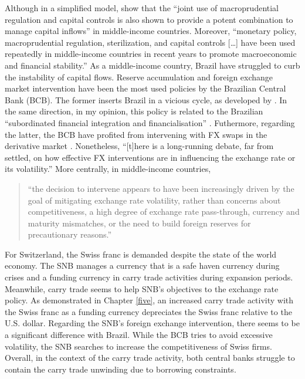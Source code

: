 \documentclass[a4paper, twoside]{templates/ociamthesis}
\begin{document}
Although in a simplified model, \textcite[ 1]{agenor2021} show that the ``joint use of macroprudential regulation and capital controls is also shown to provide a potent combination to manage capital inflows'' in middle-income countries. Moreover, ``monetary policy, macroprudential regulation, sterilization, and capital controls {[}\ldots{]} have been used repeatedly in middle-income countries in recent years to promote macroeconomic and financial stability.'' \autocite[ 58]{agenor2021} As a middle-income country, Brazil have struggled to curb the instability of capital flows. Reserve accumulation and foreign exchange market intervention have been the most used policies by the Brazilian Central Bank (BCB). The former inserts Brazil in a vicious cycle, as developed by \textcite{darista2018}. In the same direction, in my opinion, this policy is related to the Brazilian ``subordinated financial integration and financialisation'' \autocite{kaltenbrunner2018a}. Futhermore, regarding the latter, the BCB have profited from intervening with FX swaps in the derivative market \autocite{sandri2020}. Nonetheless, ``{[}t{]}here is a long-running debate, far from settled, on how effective FX interventions are in influencing the exchange rate or its volatility.'' \autocite[ 32]{patel2019} More centrally, in middle-income countries,

\begin{quote}
``the decision to intervene appears to have been increasingly driven by the goal of mitigating exchange rate volatility, rather than concerns about competitiveness, a high degree of exchange rate pass-through, currency and maturity mismatches, or the need to build foreign reserves for precautionary reasons.'' \autocite[ 2]{agenor2021}
\end{quote}

For Switzerland, the Swiss franc is demanded despite the state of the world economy. The SNB manages a currency that is a safe haven currency during crises and a funding currency in carry trade activities during expansion periods. Meanwhile, carry trade seems to help SNB's objectives to the exchange rate policy. As demonstrated in Chapter \ref{five}, an increased carry trade activity with the Swiss franc as a funding currency depreciates the Swiss franc relative to the U.S. dollar. Regarding the SNB's foreign exchange intervention, there seems to be a significant difference with Brazil. While the BCB tries to avoid excessive volatility, the SNB searches to increase the competitiveness of Swiss firms. Overall, in the context of the carry trade activity, both central banks struggle to contain the carry trade unwinding due to borrowing constraints.
\end{document}
